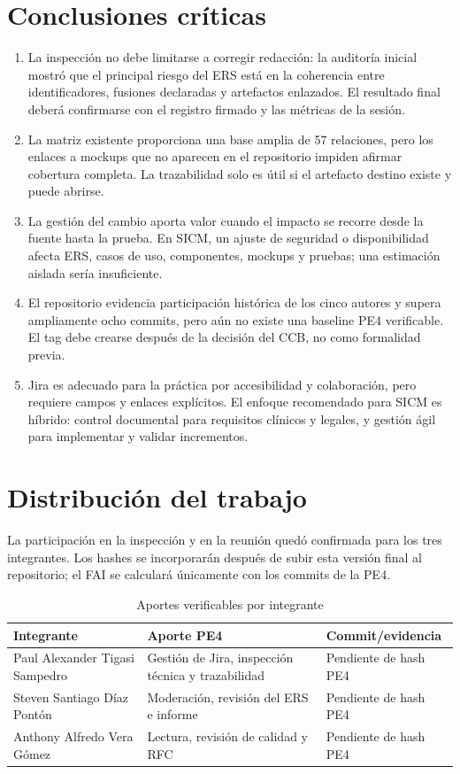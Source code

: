 \documentclass[11pt,a4paper]{article}
\begin{document}
	\section{Conclusiones críticas}
	\begin{enumerate}
		\item La inspección no debe limitarse a corregir redacción: la auditoría inicial mostró que el principal riesgo del ERS está en la coherencia entre identificadores, fusiones declaradas y artefactos enlazados. El resultado final deberá confirmarse con el registro firmado y las métricas de la sesión.
		\item La matriz existente proporciona una base amplia de 57 relaciones, pero los enlaces a mockups que no aparecen en el repositorio impiden afirmar cobertura completa. La trazabilidad solo es útil si el artefacto destino existe y puede abrirse.
		\item La gestión del cambio aporta valor cuando el impacto se recorre desde la fuente hasta la prueba. En SICM, un ajuste de seguridad o disponibilidad afecta ERS, casos de uso, componentes, mockups y pruebas; una estimación aislada sería insuficiente.
		\item El repositorio evidencia participación histórica de los cinco autores y supera ampliamente ocho commits, pero aún no existe una baseline PE4 verificable. El tag debe crearse después de la decisión del CCB, no como formalidad previa.
		\item Jira es adecuado para la práctica por accesibilidad y colaboración, pero requiere campos y enlaces explícitos. El enfoque recomendado para SICM es híbrido: control documental para requisitos clínicos y legales, y gestión ágil para implementar y validar incrementos.
	\end{enumerate}
	
	\section{Distribución del trabajo}
	La participación en la inspección y en la reunión quedó confirmada para los tres integrantes. Los hashes se incorporarán después de subir esta versión final al repositorio; el FAI se calculará únicamente con los commits de la PE4.
	\begin{table}[H]
		\centering
		\caption{Aportes verificables por integrante}
		\begin{tabularx}{\textwidth}{p{4.1cm}X p{3.0cm}}
			\toprule
			\textbf{Integrante} & \textbf{Aporte PE4} & \textbf{Commit/evidencia}\\
			\midrule
			Paul Alexander Tigasi Sampedro & Gestión de Jira, inspección técnica y trazabilidad & Pendiente de hash PE4\\
			Steven Santiago Díaz Pontón & Moderación, revisión del ERS e informe & Pendiente de hash PE4\\
			Anthony Alfredo Vera Gómez & Lectura, revisión de calidad y RFC & Pendiente de hash PE4\\
			\bottomrule
		\end{tabularx}
	\end{table}
	
\end{document}
